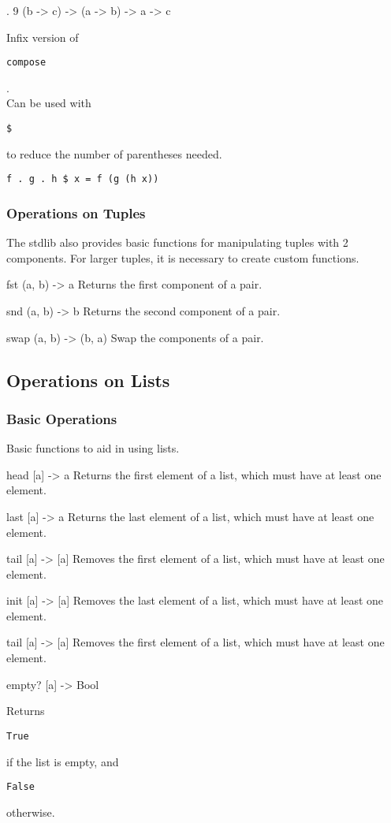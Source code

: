 \documentclass{article}
\def\code#1{\begin{footnotesize}\texttt{#1}\end{footnotesize}}
\begin{document}
\liboperator
  {.}
  {\rightassociative}
  {9}
  {(b -> c) -> (a -> b) -> a -> c}
  {Infix version of \code{compose}.
  \\
  Can be used with \code{\$} to reduce the number of parentheses needed.

  \code{f . g . h \$ x = f (g (h x))}}

\subsubsection{Operations on Tuples}

The stdlib also provides basic functions for manipulating tuples with 2 components.
For larger tuples, it is necessary to create custom functions.

\medskip

\libfunction
  {fst}
  {(a, b) -> a}
  {Returns the first component of a pair.}

\libfunction
  {snd}
  {(a, b) -> b}
  {Returns the second component of a pair.}

\libfunction
  {swap}
  {(a, b) -> (b, a)}
  {Swap the components of a pair.}

\subsection{Operations on Lists}

\subsubsection{Basic Operations}

Basic functions to aid in using lists.

\medskip

\libfunction
  {head}
  {[a] -> a}
  {Returns the first element of a list, which must have at least one element.}

\libfunction
  {last}
  {[a] -> a}
  {Returns the last element of a list, which must have at least one element.}

\libfunction
  {tail}
  {[a] -> [a]}
  {Removes the first element of a list, which must have at least one element.}

\libfunction
  {init}
  {[a] -> [a]}
  {Removes the last element of a list, which must have at least one element.}

\libfunction
  {tail}
  {[a] -> [a]}
  {Removes the first element of a list, which must have at least one element.}

\libfunction
  {empty?}
  {[a] -> Bool}
  {Returns \code{True} if the list is empty, and \code{False} otherwise.}
\end{document}
